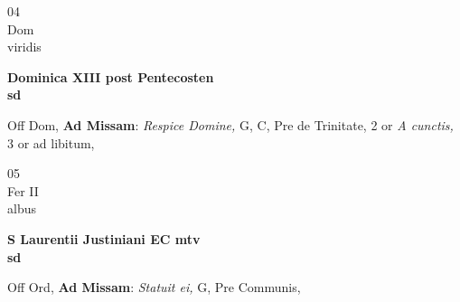 \documentclass[10pt, openany]{book}
\begin{document}
        \begin{center}
            \begin{minipage}{3.5in}
                \vspace{2em}
                \begin{minipage}{0.5in}
                    {\Huge 04} \\
                    {\normalsize Dom} \\
                    {\normalsize viridis}
                \end{minipage}
                \begin{minipage}{3.0in}
                    \textbf{ \large Dominica XIII post Pentecosten \\
                    \textnormal{\normalsize sd}} \\ 
                \end{minipage}
                \begin{justify}Off Dom, \textbf{Ad Missam}: \textit{Respice Domine,} G, C, Pre de Trinitate, 2 or \textit{A cunctis,} 3 or ad libitum,   
                \end{justify}
            \end{minipage}
        \end{center}
    
        \begin{center}
            \begin{minipage}{3.5in}
                \vspace{2em}
                \begin{minipage}{0.5in}
                    {\Huge 05} \\
                    {\normalsize Fer II} \\
                    {\normalsize albus}
                \end{minipage}
                \begin{minipage}{3.0in}
                    \textbf{ \large S Laurentii Justiniani EC mtv \\
                    \textnormal{\normalsize sd}} \\ 
                \end{minipage}
                \begin{justify}Off Ord, \textbf{Ad Missam}: \textit{Statuit ei,} G, Pre Communis,   
                \end{justify}
            \end{minipage}
        \end{center}
    
\end{document}
